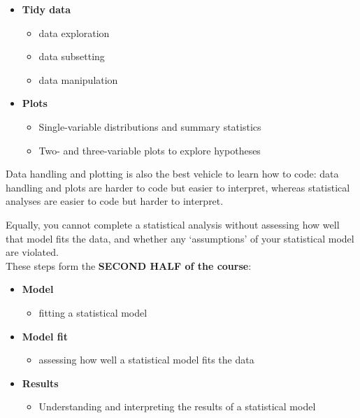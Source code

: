 \documentclass[
]{book}
\providecommand{\tightlist}{%
  \setlength{\itemsep}{0pt}\setlength{\parskip}{0pt}}
\begin{document}
\begin{itemize}
\tightlist
\item
  \textbf{Tidy data}

  \begin{itemize}
  \tightlist
  \item
    data exploration
  \item
    data subsetting
  \item
    data manipulation
  \end{itemize}
\item
  \textbf{Plots}

  \begin{itemize}
  \tightlist
  \item
    Single-variable distributions and summary statistics
  \item
    Two- and three-variable plots to explore hypotheses
  \end{itemize}
\end{itemize}

Data handling and plotting is also the best vehicle to learn how to
code: data handling and plots are harder to code but easier to interpret,
whereas statistical analyses are easier to code but harder to interpret.

Equally, you cannot complete a statistical analysis without assessing how well
that model fits the data, and whether any `assumptions' of your statistical
model are violated.\\
These steps form the \textbf{SECOND HALF of the course}:

\begin{itemize}
\tightlist
\item
  \textbf{Model}

  \begin{itemize}
  \tightlist
  \item
    fitting a statistical model
  \end{itemize}
\item
  \textbf{Model fit}

  \begin{itemize}
  \tightlist
  \item
    assessing how well a statistical model fits the data
  \end{itemize}
\item
  \textbf{Results}

  \begin{itemize}
  \tightlist
  \item
    Understanding and interpreting the results of a statistical model
  \end{itemize}
\end{itemize}
\end{document}
